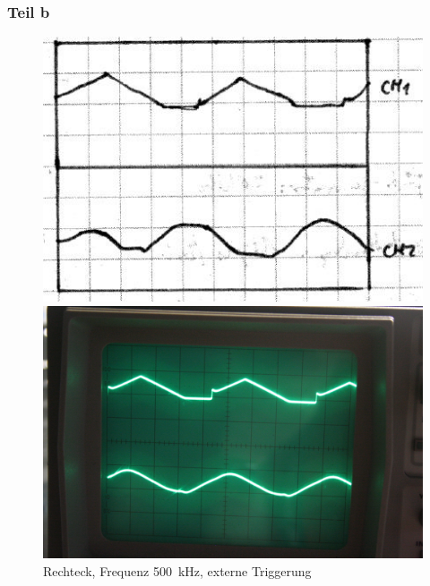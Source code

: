 \subsubsection{Teil b}

\begin{figure}
	\centering
	\begin{minipage}{.45\linewidth}
	\includegraphics[width=\linewidth]{Skizzen/IMG_0779-1500.jpg}
	\end{minipage}
	\hfill
	\begin{minipage}{.45\linewidth}
	\includegraphics[width=\linewidth]{Fotos/IMG_0779-1500.jpg}
	\end{minipage}
	\caption{%
		Rechteck, Frequenz \SI{500}{\kilo\hertz},
		externe Triggerung
	}
	\label{fig:0779}
\end{figure}


